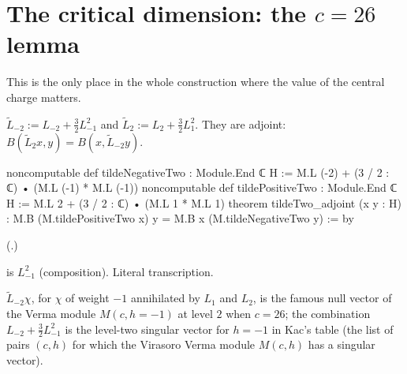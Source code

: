 \section{The critical dimension: the \texorpdfstring{$c=26$}{c = 26} lemma}\label{ch18:sec:critical}

This is the only place in the whole construction where the value of the central charge matters.

\begin{definition}\label{ch18:def:tilde}
$\widetilde L_{-2}:=L_{-2}+\tfrac32L_{-1}^2$ and $\widetilde L_2:=L_2+\tfrac32L_1^2$.  They are adjoint:
$B(\widetilde L_2x,y)=B(x,\widetilde L_{-2}y)$.
\end{definition}
\begin{leancode}
noncomputable def tildeNegativeTwo : Module.End ℂ H := M.L (-2) + (3 / 2 : ℂ) • (M.L (-1) * M.L (-1))
noncomputable def tildePositiveTwo : Module.End ℂ H := M.L 2 + (3 / 2 : ℂ) • (M.L 1 * M.L 1)
theorem tildeTwo_adjoint (x y : H) :
    M.B (M.tildePositiveTwo x) y = M.B x (M.tildeNegativeTwo y) := by
\end{leancode}
(.)
\begin{dictionary}
 is $L_{-1}^2$ (composition).  Literal transcription.
\end{dictionary}
\begin{physics}
$\widetilde L_{-2}\chi$, for $\chi$ of weight $-1$ annihilated by $L_1$ and $L_2$, is the famous null
vector of the Verma module $M(c,h=-1)$ at level $2$ when $c=26$; the combination $L_{-2}+\frac32L_{-1}^2$ is
the level-two singular vector for $h=-1$ in Kac's table (the list of pairs $(c,h)$ for which the Virasoro Verma module $M(c,h)$ has a singular vector).
\end{physics}

